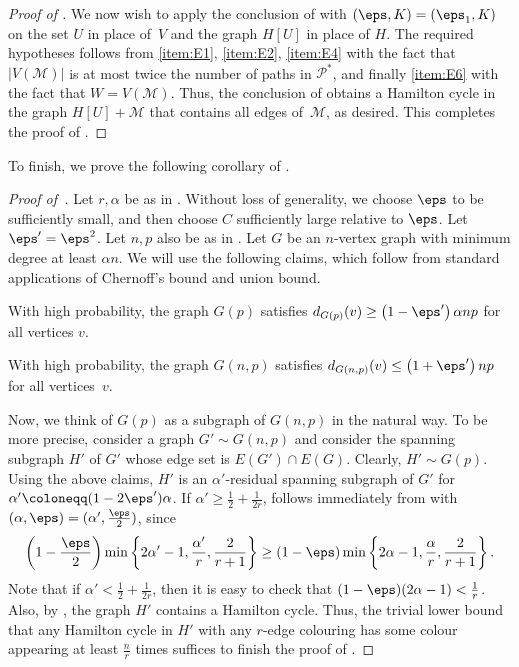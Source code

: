 \documentclass[10pt,a4paper,reqno]{amsart}
\begin{document}
\begin{proof}[Proof of ]
We now wish to apply the conclusion of  with $(\eps, K) = (\eps_1, K)$ on the set $U$ in place of~$V$ and the graph $H[U]$ in place of $H$. The required hypotheses follows from \ref{item:E1}, \ref{item:E2}, \ref{item:E4} with the fact that $|V(\mathcal{M})|$ is at most twice the number of paths in $\mathcal{P}^*$, and finally \ref{item:E6} with the fact that $W=V(\mathcal{M})$. Thus, the conclusion of  obtains a Hamilton cycle in the graph $H[U] + \mathcal{M}$ that contains all edges of~$\mathcal{M}$, as desired. This completes the proof of .
\end{proof}

To finish, we prove the following corollary of .
\corGp*
\begin{proof}[Proof of~]
Let $r, \alpha$ be as in . Without loss of generality, we choose $\eps$ to be sufficiently small, and then choose $C$ sufficiently large relative to $\eps$. Let $\eps' = \eps^2$. Let $n, p$ also be as in . Let $G$ be an $n$-vertex graph with minimum degree at least $\alpha n$. We will use the following claims, which follow from standard applications of Chernoff's bound and union bound.
\begin{claim}
    With high probability, the graph $G(p)$ satisfies $d_{G(p)}(v) \ge \left(1 - \eps' \right)\alpha np$ for all vertices $v$.
\end{claim}
\begin{claim}
    With high probability, the graph $G(n,p)$ satisfies $d_{G(n,p)}(v) \le \left(1 + \eps' \right) np$ for all vertices~$v$.
\end{claim}
Now, we think of $G(p)$ as a subgraph of $G(n,p)$ in the natural way. To be more precise, consider a graph $G'\sim G(n,p)$ and consider the spanning subgraph $H'$ of $G'$ whose edge set is $E(G')\cap E(G)$. Clearly, $H'\sim G(p)$. Using the above claims, \whp $H'$ is an $\alpha'$-residual spanning subgraph of $G'$ for $\alpha' \coloneqq (1-2\eps')\alpha$. If $\alpha' \ge \frac{1}{2} + \frac{1}{2r}$,  follows immediately from  with $(\alpha, \eps) = (\alpha', \frac{\eps}{2})$, since 
\[
\left(1-\frac{\eps}{2}\right)\min\left\{2\alpha' - 1, \frac{\alpha'}{r}, \frac{2}{r+1} \right\} \ge (1-\eps)\min\left\{2\alpha - 1, \frac{\alpha}{r}, \frac{2}{r+1} \right\}.
\]
Note that if $\alpha' < \frac{1}{2} + \frac{1}{2r}$, then it is easy to check that $(1-\eps)(2\alpha - 1) < \frac{1}{r}$. Also, by , \whp the graph $H'$ contains a Hamilton cycle. Thus, the trivial lower bound that any Hamilton cycle in $H'$ with any $r$-edge colouring has some colour appearing at least $\frac{n}{r}$ times suffices to finish the proof of .
\end{proof}



\end{document}
